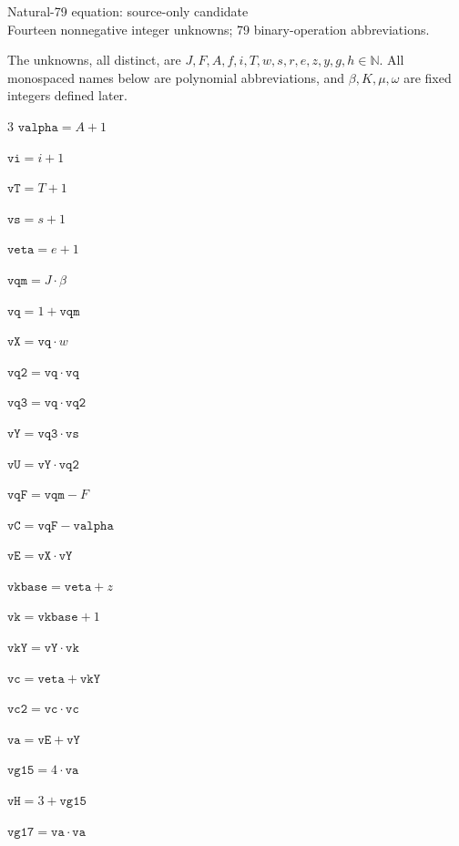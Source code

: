 \documentclass[10pt]{article}
\begin{document}
\begin{center}{\Large Natural-79 equation: source-only candidate}\\
Fourteen nonnegative integer unknowns; 79 binary-operation abbreviations.
\end{center}
The unknowns, all distinct, are $J,F,A,f,i,T,w,s,r,e,z,y,g,h\in\mathbb N$.
All monospaced names below are polynomial abbreviations, and $\beta,K,\mu,\omega$ are fixed integers defined later.
\begin{multicols}{3}\small
\noindent $\mathtt{valpha} = A+1$\par
\noindent $\mathtt{vi} = i+1$\par
\noindent $\mathtt{vT} = T+1$\par
\noindent $\mathtt{vs} = s+1$\par
\noindent $\mathtt{veta} = e+1$\par
\noindent $\mathtt{vqm} = J\cdot \beta$\par
\noindent $\mathtt{vq} = 1+\mathtt{vqm}$\par
\noindent $\mathtt{vX} = \mathtt{vq}\cdot w$\par
\noindent $\mathtt{vq2} = \mathtt{vq}\cdot \mathtt{vq}$\par
\noindent $\mathtt{vq3} = \mathtt{vq}\cdot \mathtt{vq2}$\par
\noindent $\mathtt{vY} = \mathtt{vq3}\cdot \mathtt{vs}$\par
\noindent $\mathtt{vU} = \mathtt{vY}\cdot \mathtt{vq2}$\par
\noindent $\mathtt{vqF} = \mathtt{vqm}-F$\par
\noindent $\mathtt{vC} = \mathtt{vqF}-\mathtt{valpha}$\par
\noindent $\mathtt{vE} = \mathtt{vX}\cdot \mathtt{vY}$\par
\noindent $\mathtt{vkbase} = \mathtt{veta}+z$\par
\noindent $\mathtt{vk} = \mathtt{vkbase}+1$\par
\noindent $\mathtt{vkY} = \mathtt{vY}\cdot \mathtt{vk}$\par
\noindent $\mathtt{vc} = \mathtt{veta}+\mathtt{vkY}$\par
\noindent $\mathtt{vc2} = \mathtt{vc}\cdot \mathtt{vc}$\par
\noindent $\mathtt{va} = \mathtt{vE}+\mathtt{vY}$\par
\noindent $\mathtt{vg15} = 4\cdot \mathtt{va}$\par
\noindent $\mathtt{vH} = 3+\mathtt{vg15}$\par
\noindent $\mathtt{vg17} = \mathtt{va}\cdot \mathtt{va}$\par

\end{multicols}
\end{document}
